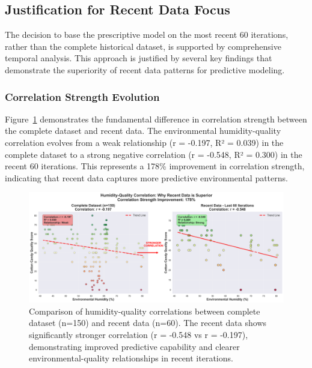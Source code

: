 
\subsection{Justification for Recent Data Focus}

The decision to base the prescriptive model on the most recent 60 iterations, rather than the complete historical dataset, is supported by comprehensive temporal analysis. This approach is justified by several key findings that demonstrate the superiority of recent data patterns for predictive modeling.

\subsubsection{Correlation Strength Evolution}

Figure~\ref{fig:correlation-superiority} demonstrates the fundamental difference in correlation strength between the complete dataset and recent data. The environmental humidity-quality correlation evolves from a weak relationship (r = -0.197, R² = 0.039) in the complete dataset to a strong negative correlation (r = -0.548, R² = 0.300) in the recent 60 iterations. This represents a 178\% improvement in correlation strength, indicating that recent data captures more predictive environmental patterns.

\begin{figure}[htbp]
    \centering
    \includegraphics[width=\textwidth]{graphs/correlation_superiority_comparison.png}
    \caption{Comparison of humidity-quality correlations between complete dataset (n=150) and recent data (n=60). The recent data shows significantly stronger correlation (r = -0.548 vs r = -0.197), demonstrating improved predictive capability and clearer environmental-quality relationships in recent iterations.}
    \label{fig:correlation-superiority}
\end{figure}

